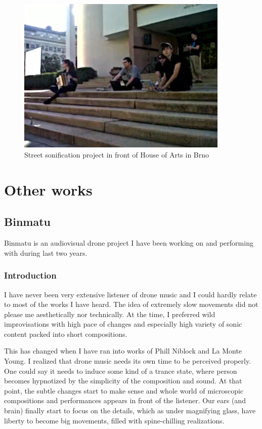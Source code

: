 \documentclass[12pt,a4paper,oneside]{report}
\begin{document}
\begin{figure}  
  \centering
    \includegraphics[width=0.9\textwidth]{img/workshop}
	\caption{Street sonification project in front of House of Arts in Brno}
	\label{fig:workshop}
\end{figure}


\chapter{Other works} 

\section{Binmatu} Binmatu is an audiovisual drone project I have been working on and performing with during last two years.

\subsection{Introduction} I have never been very extensive listener of drone music and I could hardly relate to most of the works I have heard. The idea of extremely slow movements did not please me aesthetically nor technically. At the time, I preferred wild improvisations with high pace of changes and especially high variety of sonic content packed into short compositions.

This has changed when I have ran into works of Phill Niblock and La Monte Young. I realized that drone music needs its own time to be perceived properly. One could say it needs to induce some kind of a trance state, where person becomes hypnotized by the simplicity of the composition and sound. At that point, the subtle changes start to make sense and whole world of microscopic compositions and performances appears in front of the listener. Our ears (and brain) finally start to focus on the details, which as under magnifying glass, have liberty to become big movements, filled with spine-chilling realizations.
\end{document}
